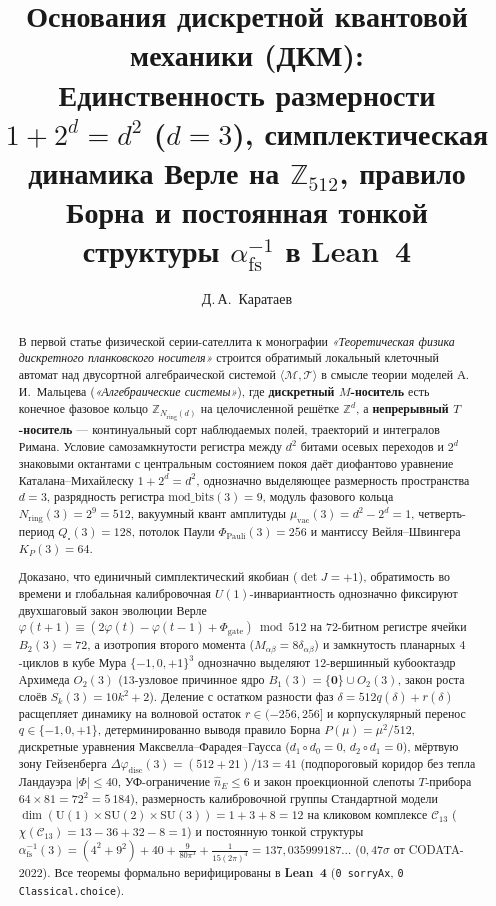 \documentclass[11pt,a4paper]{article}
\title{\textbf{Основания дискретной квантовой механики (ДКМ):\\ Единственность размерности $1 + 2^d = d^2$ ($d = 3$), симплектическая динамика Верле на $\mathbb{Z}_{512}$, правило Борна и постоянная тонкой структуры $\alpha_{\mathrm{fs}}^{-1}$ в Lean~4}}
\author{Д.\,А.~Каратаев}
\date{}
\theoremstyle{plain}
\theoremstyle{definition}
\begin{document}
\maketitle

\begin{abstract}
В первой статье физической серии-сателлита к монографии \emph{«Теоретическая физика дискретного планковского носителя»} строится обратимый локальный клеточный автомат над двусортной алгебраической системой $\langle\mathcal{M},\mathcal{T}\rangle$ в смысле теории моделей А.\,И.~Мальцева (\emph{«Алгебраические системы»}), где \textbf{дискретный $M$-носитель} есть конечное фазовое кольцо $\mathbb{Z}_{N_{\mathrm{ring}}(d)}$ на целочисленной решётке $\mathbb{Z}^d$, а \textbf{непрерывный $T$-носитель} --- континуальный сорт наблюдаемых полей, траекторий и интегралов Римана. Условие самозамкнутости регистра между $d^2$ битами осевых переходов и $2^d$ знаковыми октантами с центральным состоянием покоя даёт диофантово уравнение Каталана--Михайлеску $1 + 2^d = d^2$, однозначно выделяющее размерность пространства $d = 3$, разрядность регистра $\mathrm{mod\_bits}(3) = 9$, модуль фазового кольца $N_{\mathrm{ring}}(3) = 2^9 = 512$, вакуумный квант амплитуды $\mu_{\mathrm{vac}}(3) = d^2 - 2^d = 1$, четверть-период $Q_\square(3) = 128$, потолок Паули $\Phi_{\mathrm{Pauli}}(3) = 256$ и мантиссу Вейля--Швингера $K_P(3) = 64$.

Доказано, что единичный симплектический якобиан ($\det J = +1$), обратимость во времени и глобальная калибровочная $U(1)$-инвариантность однозначно фиксируют двухшаговый закон эволюции Верле $\varphi(t+1)\equiv (2\varphi(t)-\varphi(t-1)+\Phi_{\mathrm{gate}})\bmod 512$ на $72$-битном регистре ячейки $B_2(3) = 72$, а изотропия второго момента ($M_{\alpha\beta} = 8\delta_{\alpha\beta}$) и замкнутость планарных $4$-циклов в кубе Мура $\{-1,0,+1\}^3$ однозначно выделяют $12$-вершинный кубооктаэдр Архимеда $O_2(3)$ ($13$-узловое причинное ядро $B_1(3) = \{\mathbf{0}\}\cup O_2(3)$, закон роста слоёв $S_k(3) = 10k^2 + 2$). Деление с остатком разности фаз $\delta = 512 q(\delta) + r(\delta)$ расщепляет динамику на волновой остаток $r\in(-256,256]$ и корпускулярный перенос $q\in\{-1,0,+1\}$, детерминированно выводя правило Борна $P(\mu) = \mu^2/512$, дискретные уравнения Максвелла--Фарадея--Гаусса ($d_1\circ d_0 = 0$, $d_2\circ d_1 = 0$), мёртвую зону Гейзенберга $\Delta\varphi_{\mathrm{disc}}(3) = (512+21)/13 = 41$ (подпороговый коридор без тепла Ландауэра $|\Phi|\le 40$, УФ-ограничение $\hat{n}_E\le 6$ и закон проекционной слепоты $T$-прибора $64\times 81 = 72^2 = 5\,184$), размерность калибровочной группы Стандартной модели $\dim(\mathrm{U}(1)\times\mathrm{SU}(2)\times\mathrm{SU}(3)) = 1+3+8 = 12$ на кликовом комплексе $\mathcal{C}_{13}$ ($\chi(\mathcal{C}_{13}) = 13-36+32-8 = 1$) и постоянную тонкой структуры $\alpha_{\mathrm{fs}}^{-1}(3) = (4^2+9^2) + 40 + \frac{9}{80\pi^3} + \frac{1}{15(2\pi)^4} = 137{,}035999187\dots$ ($0{,}47\sigma$ от CODATA-2022). Все теоремы формально верифицированы в \textbf{Lean~4} (\texttt{0 sorryAx}, \texttt{0 Classical.choice}).


\end{abstract}
\end{document}
